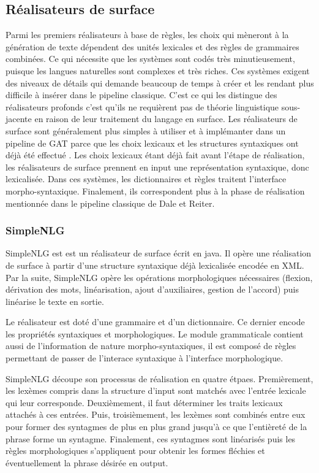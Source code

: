 \subsection{Réalisateurs de surface}

Parmi les premiers réalisateurs à base de règles, les choix qui mèneront à la génération de texte dépendent des unités lexicales et des règles de grammaires combinées. Ce qui nécessite que les systèmes sont codés très minutieusement, puisque les langues naturelles sont complexes et très riches. Ces systèmes exigent des niveaux de détails qui demande beaucoup de temps à créer et les rendant plus difficile à insérer dans le pipeline classique. C'est ce qui les distingue des réalisateurs profonds c'est qu'ils ne requièrent pas de théorie linguistique sous-jacente en raison de leur traitement du langage en surface. Les réalisateurs de surface sont généralement plus simples à utiliser et à implémanter dans un pipeline de \ac{GAT} \citep{gatt18} parce que les choix lexicaux et les structures syntaxiques ont déjà été effectué \citep{lareau18}. Les choix lexicaux étant déjà fait avant l'étape de réalisation, les réalisateurs de surface prennent en input une représentation syntaxique, donc lexicalisée. Dans ces systèmes, les dictionnaires et règles traitent l'interface morpho-syntaxique. Finalement, ils correspondent plus à la phase de réalisation mentionnée dans le pipeline classique de Dale et Reiter.

\subsubsection{SimpleNLG}
SimpleNLG est \citep{GattSimpleNLGRealisationEngine2009} est un réalisateur de surface écrit en java. Il opère une réalisation de surface à partir d'une structure syntaxique déjà lexicalisée encodée en XML. Par la suite, SimpleNLG opère les opérations morphologiques nécessaires (flexion, dérivation des mots, linéarisation, ajout d'auxiliaires, gestion de l'accord) puis linéarise le texte en sortie.

Le réalisateur est doté d'une grammaire et d'un dictionnaire. Ce dernier encode les propriétés syntaxiques et morphologiques. Le module grammaticale contient aussi de l'information de nature morpho-syntaxiques, il est composé de règles permettant de passer de l'interace syntaxique à l'interface morphologique.

SimpleNLG découpe son processus de réalisation en quatre étpaes. Premièrement, les lexèmes compris dans la structure d'input sont matchés avec l'entrée lexicale qui leur corresponde. Deuxièmement, il faut déterminer les traits lexicaux attachés à ces entrées. Puis, troisièmement, les lexèmes sont combinés entre eux pour former des syntagmes de plus en plus grand jusqu'à ce que l'entièreté de la phrase forme un syntagme. Finalement, ces syntagmes sont linéarisés puis les règles morphologiques s'appliquent pour obtenir les formes fléchies et éventuellement la phrase désirée en output.


